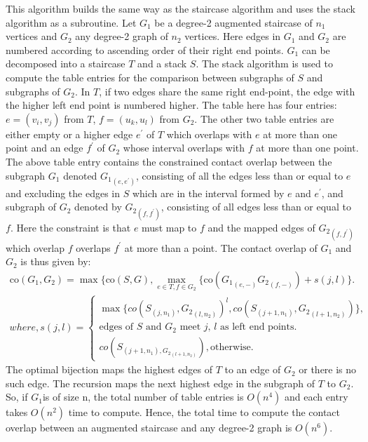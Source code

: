 This algorithm builds the same way as the staircase algorithm and uses the stack algorithm as a subroutine. Let $G_1$ be a degree-2 augmented staircase of $n_1$ vertices and $G_2$ any degree-2 graph of $n_2$ vertices. Here edges in $G_1$ and $G_2$ are numbered according to ascending order of their right end points. $G_1$ can be decomposed into a staircase $T$ and a stack $S$. The stack algorithm is used to compute the table entries for the comparison between subgraphs of $S$ and subgraphs of $G_2$. In $T$, if two edges share the same right end-point, the edge with the higher left end point is numbered higher. The table here has four entries: $e=(v_i,v_j)$ from $T$, $f=(u_k,u_l)$ from $G_2$. The other two table entries are either empty or a higher edge $e^\prime$ of $T$ which overlaps with $e$ at more than one point and an edge $f^\prime$ of $G_2$ whose interval overlaps with $f$ at more than one point. The above table entry contains the constrained contact overlap between the subgraph $G_1$ denoted ${G_1}_{(e,{e^\prime})}$, consisting of all the edges less than or equal to $e$ and excluding the edges in $S$ which are in the interval formed by $e$ and $e^\prime$, and subgraph of $G_2$ denoted by ${G_2}_{(f,{f^\prime})}$, consisting of all edges less than or equal to $f$. Here  the constraint is that $e$ must map to $f$ and the mapped edges of ${G_2}_{(f,{f^\prime})}$ which overlap $f$ overlaps $f^\prime$ at more than a point. The contact overlap of $G_1$ and $G_2$ is thus given by:
\begin{eqnarray}
\label{sqs4}
\text{co}(G_1,G_2) = \max\{\text{co}(S,G),\max_{e \in T, f \in G_2}\{\text{co}({G_1}_{(e,-)} {G_2}_{(f,-)}) + s(j,l)\}.
\end{eqnarray}
\begin{eqnarray}
where, s(j,l) = \begin{cases}
    \max\{co(S_{(j,n_1)},{G_2}_{(l,{n_2})})^l,co(S_{(j+1,n_1)},{G_2}_{(l+1,n_2)})\}, & \\ \text{edges of $S$ and $G_2$ meet $j$, $l$ as left end points}.\\
    co(S_{(j+1,n_1),{G_2}_{(l+1,n_2)}}), \text{otherwise}.
  \end{cases}
\end{eqnarray}
The optimal bijection maps the highest edges of $T$ to an edge of $G_2$ or there is no such edge. The recursion maps the next highest edge in the subgraph of $T$ to $G_2$. So, if $G_1$is of size n, the total number of table entries is $O(n^4)$ and each entry takes $O(n^2)$ time to compute. Hence, the total time to compute the contact overlap between an augmented staircase and any degree-2 graph is $O(n^6)$. 